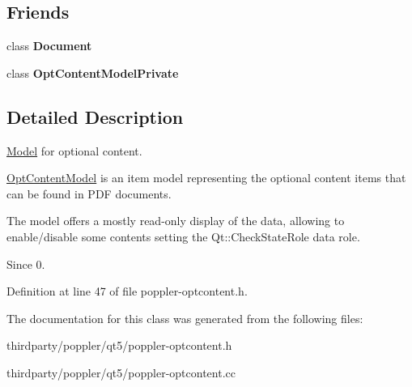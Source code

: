 \subsection*{Friends}
\begin{DoxyCompactItemize}
\item 
\mbox{\label{class_poppler_1_1_opt_content_model_a883538034e58fc5c0de7d4e4cab3cef7}} 
class {\bfseries Document}
\item 
\mbox{\label{class_poppler_1_1_opt_content_model_af0e2ad71b3797f46715c2c2c398a2f8a}} 
class {\bfseries Opt\+Content\+Model\+Private}
\end{DoxyCompactItemize}


\subsection{Detailed Description}
\hyperlink{class_model}{Model} for optional content. 

\hyperlink{class_poppler_1_1_opt_content_model}{Opt\+Content\+Model} is an item model representing the optional content items that can be found in P\+DF documents.

The model offers a mostly read-\/only display of the data, allowing to enable/disable some contents setting the Qt\+::\+Check\+State\+Role data role.

\begin{DoxySince}{Since}
0. 
\end{DoxySince}


Definition at line 47 of file poppler-\/optcontent.\+h.



The documentation for this class was generated from the following files\+:\begin{DoxyCompactItemize}
\item 
thirdparty/poppler/qt5/poppler-\/optcontent.\+h\item 
thirdparty/poppler/qt5/poppler-\/optcontent.\+cc\end{DoxyCompactItemize}
